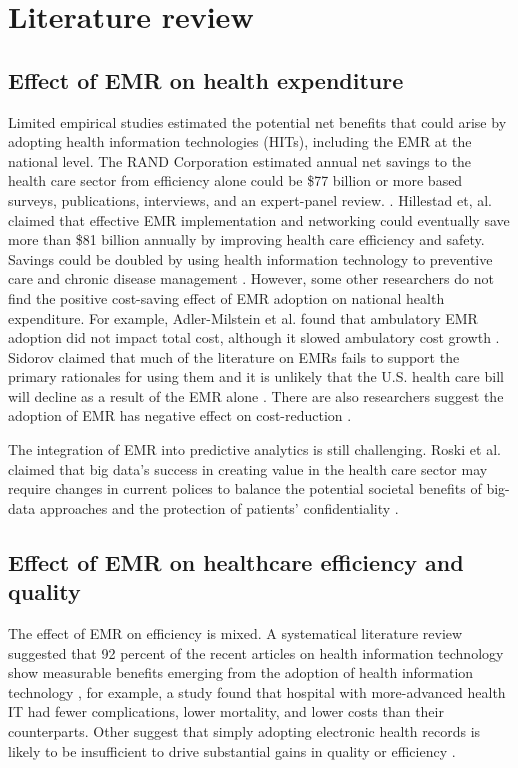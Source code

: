\section{Literature review}

\subsection{Effect of EMR on health expenditure}

Limited empirical studies estimated the potential net benefits that could arise by adopting health information technologies (HITs), including the EMR at the national level. The RAND Corporation estimated annual net savings to the health care sector from efficiency alone could be \$77 billion or more based surveys, publications, interviews, and an expert-panel review. \citep{Rand2005}. Hillestad et, al. claimed that effective EMR implementation and networking could eventually save more than \$81 billion annually by improving health care efficiency and safety. Savings could be doubled by using health information technology to preventive care and chronic disease management \citep{Hillestad2005}. However, some other researchers do not find the positive cost-saving effect of EMR adoption on national health expenditure. For example, Adler-Milstein et al. found that ambulatory EMR adoption did not impact total cost, although it slowed ambulatory cost growth \citep{Adler-Milstein2013}. Sidorov claimed that much of the literature on EMRs fails to support the primary rationales for using them and it is unlikely that the U.S. health care bill will decline as a result of the EMR alone \citep{Sidorov2006}. There are also researchers suggest the adoption of EMR has negative effect on cost-reduction  \citep{Teufel2012}.

The integration of EMR into predictive analytics is still challenging. Roski et al. claimed that big data's success in creating value in the health care sector may require changes in current polices to balance the potential societal benefits of big-data approaches and the protection of patients' confidentiality \citep{Roski2014}.

\subsection{Effect of EMR on healthcare efficiency and quality}

The effect of EMR on efficiency is mixed. A systematical literature review suggested that 92 percent of the recent articles on health information technology show measurable benefits emerging from the adoption of health information technology \citep{Buntin2011}, for example, a study found that hospital with more-advanced health IT had fewer complications, lower mortality, and lower costs than their counterparts\citep{amarasingham2009clinical}. Other suggest that simply adopting electronic health records is likely to be insufficient to drive substantial gains in quality or efficiency \citep{DesRoches2010}. 

